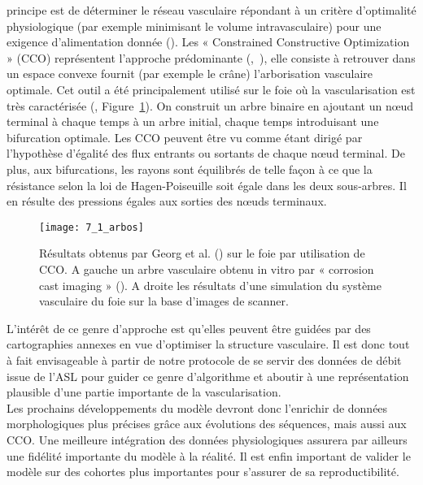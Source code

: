 principe est de déterminer le réseau vasculaire répondant à un critère d’optimalité physiologique (par
exemple minimisant le volume intravasculaire) pour une exigence d’alimentation donnée (\cite{Schwen2012}). Les
« Constrained Constructive Optimization » (CCO) représentent l’approche prédominante (\cite{Schreiner1993},~\cite{Karch1998}),
elle consiste à retrouver dans un espace convexe fournit (par exemple le crâne) l’arborisation
vasculaire optimale. Cet outil a été principalement utilisé sur le foie où la vascularisation est très
caractérisée  (\cite{Georg2010}, Figure~\ref{fig:7_1_arbos}). On construit un arbre binaire en ajoutant un nœud terminal à chaque
temps à un arbre initial, chaque temps introduisant une bifurcation optimale. Les CCO peuvent être vu
comme étant dirigé par l’hypothèse d’égalité des flux entrants ou sortants de chaque nœud terminal.
De plus, aux bifurcations, les rayons sont équilibrés de telle façon à ce que la résistance selon la loi de
Hagen-Poiseuille soit égale dans les deux sous-arbres. Il en résulte des pressions égales aux sorties des
nœuds terminaux.\\
\begin{figure}[!t]
\centering
\texttt{[image: 7\_1\_arbos]}
\caption{Résultats obtenus par Georg et al. (\cite{Georg2010}) sur le foie par utilisation de CCO. A gauche un arbre vasculaire obtenu in
vitro par « corrosion cast imaging » (\cite{Hahn2003}). A droite les résultats d’une simulation du système vasculaire du foie sur la base
d’images de scanner.}
\label{fig:7_1_arbos}	
\end{figure}
L’intérêt de ce genre d’approche est qu’elles peuvent être guidées par des cartographies annexes en
vue d’optimiser la structure vasculaire. Il est donc tout à fait envisageable à partir de notre protocole
de se servir des données de débit issue de l’ASL pour guider ce genre d’algorithme et aboutir à une
représentation plausible d’une partie importante de la vascularisation.\\
Les prochains développements du modèle devront donc l’enrichir de données morphologiques
plus précises grâce aux évolutions des séquences, mais aussi aux CCO. Une meilleure intégration des
données physiologiques assurera par ailleurs une fidélité importante du modèle à la réalité. Il est enfin
important de valider le modèle sur des cohortes plus importantes pour s’assurer de sa reproductibilité.







{}
